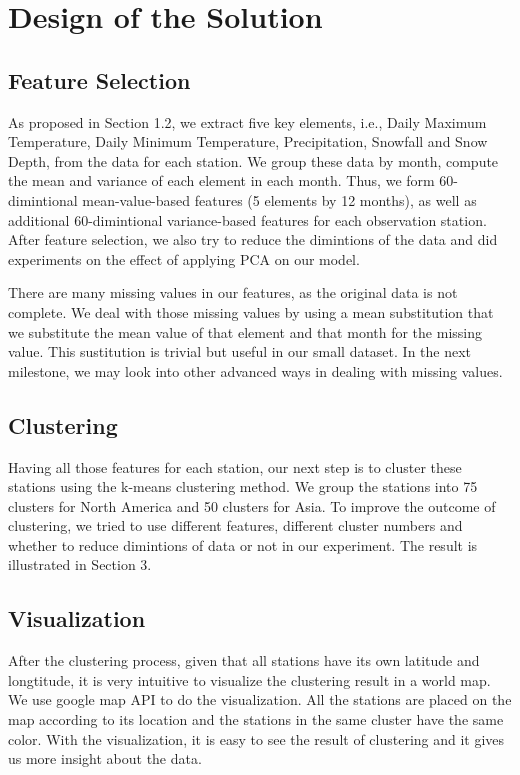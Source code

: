 \section{Design of the Solution}

\subsection{Feature Selection}
As proposed in Section 1.2, we extract five key elements, i.e., Daily Maximum Temperature, Daily Minimum Temperature, Precipitation, Snowfall and Snow Depth, from the data for each station. We group these data by month, compute the mean and variance of each element in each month. Thus, we form 60-dimintional mean-value-based features (5 elements by 12 months), as well as additional 60-dimintional variance-based features for each observation station. After feature selection, we also try to reduce the dimintions of the data and did experiments on the effect of applying PCA on our model.

There are many missing values in our features, as the original data is not complete. We deal with those missing values by using a mean substitution that we substitute the mean value of that element and that month for the missing value. This sustitution is trivial but useful in our small dataset. In the next milestone, we may look into other advanced ways in dealing with missing values.

\subsection{Clustering}
Having all those features for each station, our next step is to cluster these stations using the k-means clustering method. We group the stations into 75 clusters for North America and 50 clusters for Asia. To improve the outcome of clustering, we tried to use different features, different cluster numbers and whether to reduce dimintions of data or not in our experiment. The result is illustrated in Section 3. 

\subsection{Visualization}
After the clustering process, given that all stations have its own latitude and longtitude, it is very intuitive to visualize the clustering result in a world map. We use google map API to do the visualization. All the stations are placed on the map according to its location and the stations in the same cluster have the same color. With the visualization, it is easy to see the result of clustering and it gives us more insight about the data.

